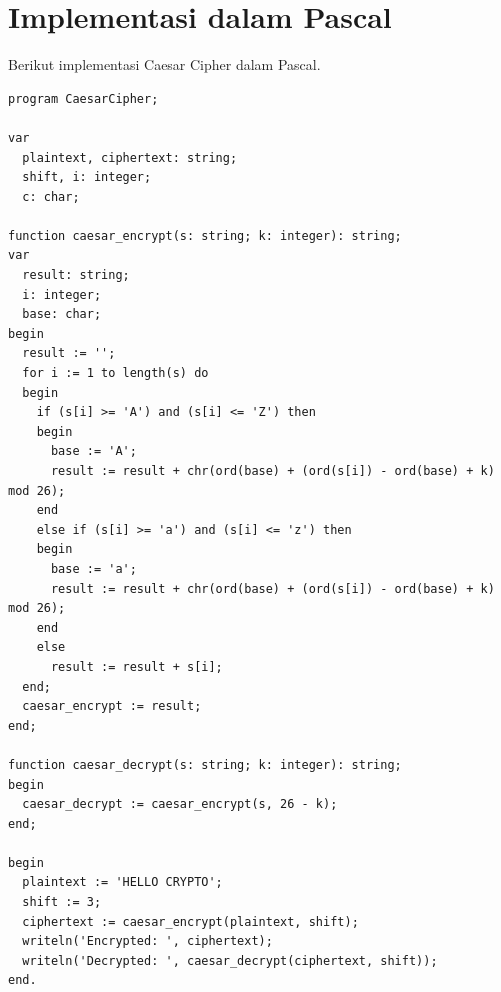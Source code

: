 \section{Implementasi dalam Pascal}

Berikut implementasi Caesar Cipher dalam Pascal.

\begin{lstlisting}[style=pascalstyle,caption={Implementasi Caesar Cipher dalam Pascal}]
program CaesarCipher;

var
  plaintext, ciphertext: string;
  shift, i: integer;
  c: char;

function caesar_encrypt(s: string; k: integer): string;
var
  result: string;
  i: integer;
  base: char;
begin
  result := '';
  for i := 1 to length(s) do
  begin
    if (s[i] >= 'A') and (s[i] <= 'Z') then
    begin
      base := 'A';
      result := result + chr(ord(base) + (ord(s[i]) - ord(base) + k) mod 26);
    end
    else if (s[i] >= 'a') and (s[i] <= 'z') then
    begin
      base := 'a';
      result := result + chr(ord(base) + (ord(s[i]) - ord(base) + k) mod 26);
    end
    else
      result := result + s[i];
  end;
  caesar_encrypt := result;
end;

function caesar_decrypt(s: string; k: integer): string;
begin
  caesar_decrypt := caesar_encrypt(s, 26 - k);
end;

begin
  plaintext := 'HELLO CRYPTO';
  shift := 3;
  ciphertext := caesar_encrypt(plaintext, shift);
  writeln('Encrypted: ', ciphertext);
  writeln('Decrypted: ', caesar_decrypt(ciphertext, shift));
end.
\end{lstlisting}
